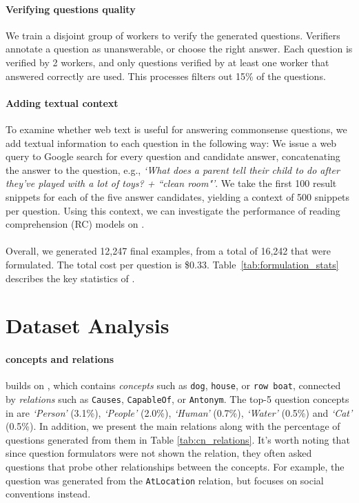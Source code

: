 \paragraph{Verifying questions quality} We train a disjoint group of workers to verify the generated questions. Verifiers annotate a question as unanswerable, or choose the right answer. Each question is verified by 2 workers, and only questions verified by at least one worker that answered correctly are used. This processes filters out 15\% of the questions.

\paragraph{Adding textual context} To examine whether web text is useful for answering commonsense questions, we add textual information to each question in the following way: We issue a web query to Google search for every question and candidate answer, concatenating the answer to the question, e.g., \emph{`What does a parent tell their child to do after they've played with a lot of toys? + ``clean room"'}. We take the first 100 result snippets for each of the five answer candidates, yielding a context of 500 snippets per question. Using this context, we can investigate the performance of reading comprehension (RC) models on \csqa{}.

\paragraph{} Overall, we generated 12,247 final examples, from a total of 16,242 that were formulated. The total cost per question is \$0.33. Table~\ref{tab:formulation_stats} describes the key statistics of \csqa{}.

\section{Dataset Analysis}
\label{sec:data_analysis}

\paragraph{\conceptnet{} concepts and relations}

\csqa{} builds on \conceptnet{}, which contains \emph{concepts} such as \texttt{dog}, \texttt{house}, or \texttt{row boat}, connected by \emph{relations} such as \texttt{Causes}, \texttt{CapableOf}, or \texttt{Antonym}. The top-5 question concepts in \csqa{} are \emph{`Person'} (3.1\%), \emph{`People'} (2.0\%), \emph{`Human'} (0.7\%), \emph{`Water'} (0.5\%) and \emph{`Cat'} (0.5\%). In addition, we present the main relations along with the percentage of questions generated from them in Table \ref{tab:cn_relations}. It's worth noting that since question formulators were not shown the \conceptnet{} relation, they often asked questions that probe other relationships between the concepts. For example, the question  was generated from the \texttt{AtLocation} relation, but focuses on social conventions instead.

